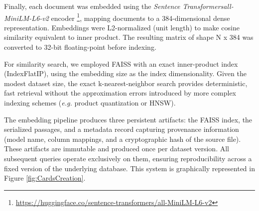 \documentclass[a4paper,fleqn]{cas-sc}
\begin{document}
Finally, each document was embedded using the \textit{Sentence Transformers}\textit{all-MiniLM-L6-v2} encoder \cite{reimers2019sentence}\footnote{\url{https://huggingface.co/sentence-transformers/all-MiniLM-L6-v2}}, mapping documents to a 384-dimensional dense representation. Embeddings were L2-normalized (unit length) to make cosine similarity equivalent to inner product. The resulting matrix of shape N x 384 was converted to 32-bit floating-point before indexing.

For similarity search, we employed FAISS \cite{johnson2019billion, douze2024faiss} with an exact inner-product index (IndexFlatIP), using the embedding size as the index dimensionality. Given the modest dataset size, the exact k-nearest-neighbor search provides deterministic, fast retrieval without the approximation errors introduced by more complex indexing schemes (\textit{e.g.} product quantization or HNSW).

The embedding pipeline produces three persistent artifacts: the FAISS index, the serialized passages, and a metadata record capturing provenance information (model name, column mappings, and a cryptographic hash of the source file). These artifacts are immutable and produced once per dataset version. All subsequent queries operate exclusively on them, ensuring reproducibility across a fixed version of the underlying database.  This system is graphically represented in Figure \ref{fig:CardsCreation}.



\end{document}
